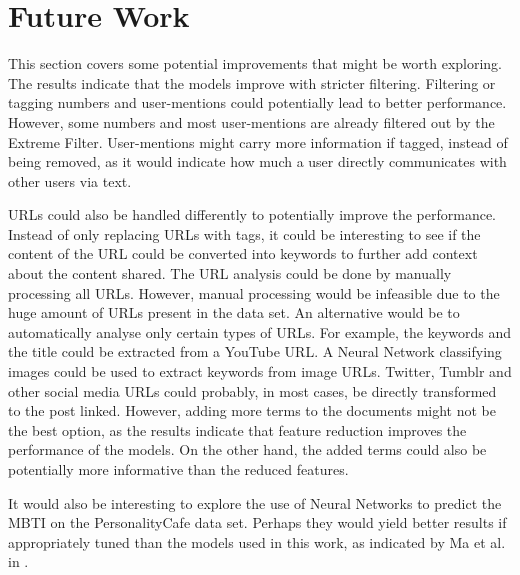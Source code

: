 \section{Future Work} \label{sec:future-work}

This section covers some potential improvements that might be worth exploring.
The results indicate that the models improve with stricter filtering.
Filtering or tagging numbers and user-mentions could potentially lead to better performance.
However, some numbers and most user-mentions are already filtered out by the Extreme Filter.
User-mentions might carry more information if tagged, instead of being removed, as it would indicate how much a user directly communicates with other users via text.

URLs could also be handled differently to potentially improve the performance.
Instead of only replacing URLs with tags, it could be interesting to see if the content of the URL could be converted into keywords to further add context about the content shared.
The URL analysis could be done by manually processing all URLs.
However, manual processing would be infeasible due to the huge amount of URLs present in the data set.
An alternative would be to automatically analyse only certain types of URLs.
For example, the keywords and the title could be extracted from a YouTube URL.
A Neural Network classifying images could be used to extract keywords from image URLs.
Twitter, Tumblr and other social media URLs could probably, in most cases, be directly transformed to the post linked.
However, adding more terms to the documents might not be the best option, as the results indicate that feature reduction improves the performance of the models.
On the other hand, the added terms could also be potentially more informative than the reduced features.

It would also be interesting to explore the use of Neural Networks to predict the MBTI on the PersonalityCafe data set.
Perhaps they would yield better results if appropriately tuned than the models used in this work, as indicated by Ma et al. in \cite{maneural}.